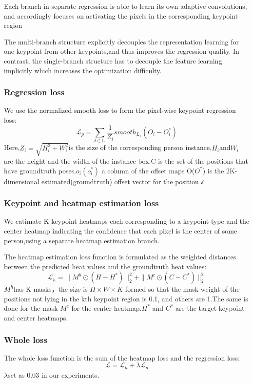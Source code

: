 \documentclass[11pt]{article}
\begin{document}
Each branch in separate regression is able to learn its own adaptive convolutions, and accordingly focuses on activating the pixels in the corresponding keypoint region

The multi-branch structure explicitly decouples the representation learning for one keypoint from other keypoints,and thus improves the regression quality. In contrast, the single-branch structure has to decouple the feature learning implicitly which increases the optimization difficulty.

\subsubsection{Regression loss}
We use the normalized smooth loss to form the pixel-wise keypoint regression loss:
$$\mathcal{L}_p = \sum_{\mathcal{i}\in C}\frac{1}{Z_i}smooth_{L_1}(O_i-O_i^*)$$
Here,$Z_i = \sqrt{H_i^2+W_i^2}$is the size of the corresponding person instance,$H_i$and$W_i$ are the height and the width of the instance box.C is the set of the positions that have groundtruth poses.$o_i(o_i^*)$ a column of the offset maps O($O^*$) is the 2K-dimensional estimated(groundtruth) offset vector for the position $\mathcal{i}$
\subsubsection{Keypoint and heatmap estimation loss}
We eatimate K keypoint heatmaps each corresponding to a keypoint type and the center heatmap indicating the confidence that each pixel is the center of some person,using a separate heatmap estimation branch.

The heatmap estimation loss function is formulated as the weighted distances between the predicted heat values and the groundtruth heat values:
$$\mathcal{L}_h = \parallel M^h \odot (H - H^*)\parallel^2_2 + \parallel M^c \odot (C - C^*)\parallel^2_2$$
$M^h$has K masks，the size is $H\times W\times K$ formed so that the mask weight of the positions not lying in the kth keypoint region is 0.1, and others are 1.The same is done for the mask $M^c$
for the center heatmap.$H^*$ and $C^*$ are the target keypoint and center heatmaps.

\subsubsection{Whole loss}
The whole loss function is the sum of the heatmap loss and the regression loss:
$$\mathcal{L} = \mathcal{L}_h + \lambda\mathcal{L}_p$$
$\lambda$set as 0.03 in our experiments.
\end{document}
